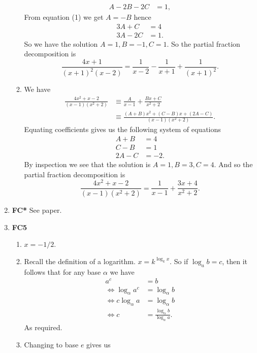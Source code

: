 \documentclass[12pt,oneside]{book}
\begin{document}
\begin{enumerate}
\begin{enumerate}
\begin{align*}
                A - 2B - 2C &= 1,
            \end{align*}
            From equation (1) we get $A = -B$ hence \begin{align*}
                3A + C &= 4 \\
                3A - 2C &= 1.
            \end{align*}
            So we have the solution $A = 1, B = -1, C = 1$. So the partial fraction decomposition is \[
                \frac{4x+1}{(x+1)^2(x-2)} = \frac{1}{x-2} - \frac{1}{x+1} + \frac{1}{(x+1)^2}
            .\] 
            \item We have \begin{align*}
                \frac{4x^2 + x - 2}{(x-1)(x^2 + 2)} &\equiv \frac{A}{x-1} + \frac{Bx+C}{x^2 + 2} \\
                &\equiv \frac{(A + B)x^2 + (C - B)x + (2A - C)}{(x-1)(x^2 + 2)}.
            \end{align*}
            Equating coefficients gives us the following system of equations \begin{align*}
                A + B &= 4 \\
                C - B &= 1 \\
                2A - C &= -2.
            \end{align*}
            By inspection we see that the solution is $A = 1, B = 3, C = 4$. And so the partial fraction decomposition is \[
                \frac{4x^2 + x - 2}{(x-1)(x^2 + 2)} = \frac{1}{x-1} + \frac{3x + 4}{x^2 + 2}
            .\] 
        \end{enumerate}
        \item \textbf{FC*} See paper. 
        \item \textbf{FC5} \begin{enumerate}
            \item $x = -1/2$.
            \item Recall the definition of a logarithm. $x = k^{\log_k x}$. So if $\log_a b = c$, then it follows that for any base $\alpha$ we have \begin{align*}
                a^c &=  b\\
                \iff \log_\alpha a^c &= \log_\alpha b \\
                \iff c \log_\alpha a &= \log_\alpha b \\
                \iff c &= \frac{\log_\alpha b}{\log_\alpha a}.
            \end{align*}
            As required.
            \item Changing to base $e$ gives us \begin{align*}

\end{align*}
\end{enumerate}
\end{enumerate}
\end{document}
